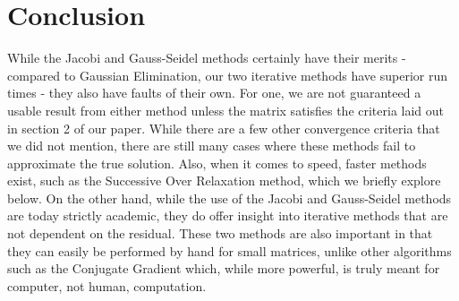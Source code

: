 \documentclass[12pt,letterpaper]{article}
\theoremstyle{definition}
\begin{document}


\section{Conclusion}
While the Jacobi and Gauss-Seidel methods certainly have their merits - compared to Gaussian Elimination, our two iterative methods have superior run times - they also have faults of their own. For one, we are not guaranteed a usable result from either method unless the matrix satisfies the criteria laid out in section 2 of our paper. While there are a few other convergence criteria that we did not mention, there are still many cases where these methods fail to approximate the true solution. Also, when it comes to speed, faster methods exist, such as the Successive Over Relaxation method, which we briefly explore below. On the other hand, while the use of the Jacobi and Gauss-Seidel methods are today strictly academic, they do offer insight into iterative methods that are not dependent on the residual. These two methods are also important in that they can easily be performed by hand for small matrices, unlike other algorithms such as the Conjugate Gradient which, while more powerful, is truly meant for computer, not human, computation.  
\end{document}
